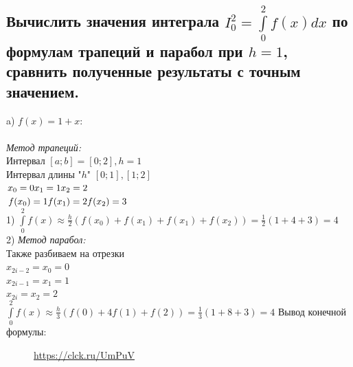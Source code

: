 \documentclass{article}
\begin{document}
\subsection{Вычислить значения интеграла $ I^2_0 = \int\limits^2_0 f(x)dx $ по формулам трапеций и парабол при $ h = 1 $, сравнить полученные результаты с точным значением.}
\Large a) $ f(x) = 1 + x $:\\\\
\large\textit{Метод трапеций:}\\
\normalsize
Интервал $ [a; b] = [0; 2], h = 1 $\\
Интервал длины "$h$" $ [0; 1], [1; 2] $\\
$ x_0 = 0 \\ x_1 = 1 \\ x_2 = 2 $\\
$ f(x_0) = 1 \\ f(x_1) = 2 \\ f(x_2) = 3 $\\
1) $ \int\limits^2_0 f(x) \approx \frac{h}{2} (f(x_0) + f(x_1) + f(x_1) + f(x_2)) = \frac{1}{2} (1+4+3) = 4 $\\
2) \large\textit{Метод парабол:}\\
\normalsize
Также разбиваем на отрезки\\
$ x_{2i-2} = x_0 = 0 $\\
$ x_{2i-1} = x_1 = 1 $\\
$ x_{2i} = x_2 = 2 $\\
$ \int\limits^2_0 f(x) \approx \frac{h}{3} (f(0) + 4f(1) + f(2)) = \frac{1}{3} (1 + 8 + 3) = 4 $
\newpage
\small Вывод конечной формулы:
\normalsize
\begin{figure}[h!]
\caption*{\url{https://clck.ru/UmPuV}}
\end{figure}\\
\end{document}
